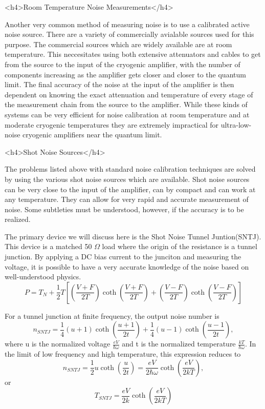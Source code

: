 \documentclass[11pt]{article}
\begin{document}
<h4>Room Temperature Noise Measurements</h4>


	
	Another very common method of measuring noise is to use a calibrated active noise source.  There are a variety of commercially avialable sources used for this purpose.  The commercial sources which are widely available are at room temperature.  This neccesitates using both extensive attenuators and cables to get from the source to the input of the cryogenic amplifier, with the number of components increasing as the amplifier gets closer and closer to the quantum limit.  The final accuracy of the noise at the input of the amplifier is then dependent on knowing the exact attenuation and temperature of every stage of the measurement chain from the source to the amplifier.  While these kinds of systems can be very efficient for noise calibration at room temperature and at moderate cryogenic temperatures they are extremely impractical for ultra-low-noise cryogenic amplifiers near the quantum limit.  

	<h4>Shot Noise Sources</h4>
	



	The problems listed above with standard noise calibration techniques are solved by using the various shot noise sources which are available.  Shot noise sources can be very close to the input of the amplifier, can by compact and can work at any temperature.  They can allow for very rapid and accurate measurement of noise.  Some subtleties must be understood, however, if the accuracy is to be realized.  




	The primary device we will discuss here is the Shot Noise Tunnel Juntion(SNTJ).  This device is a matched 50 $\Omega$ load where the origin of the resistance is a tunnel junction.  By applying a DC bias current to the junciton and measuring the voltage, it is possible to have a very accurate knowledge of the noise based on well-understood physics.  
$$P = T_N + \frac{1}{2}T\left[   \left(\frac{V+F}{2T}\right) \coth{\left(\frac{V+F}{2T}\right)} + \left(\frac{V-F}{2T}\right) \coth{\left(\frac{V-F}{2T}\right)}    \right]$$





     	For a tunnel junction at finite frequency, the output noise number is 
$$n_{SNTJ} = \frac{1}{4}\left( u + 1\right)\coth{\left(\frac{u+1}{2t}\right)} + \frac{1}{4}\left( u - 1 \right)\coth{\left(\frac{u-1}{2t}\right)} ,
$$where u is the normalized voltage $\frac{eV}{\hbar\omega}$ and t is the normalized temperature $\frac{kT}{\hbar\omega}$. In the limit of low frequency and high temperature, this expression reduces to 
$$n_{SNTJ} = \frac{1}{2}u\coth{\left(\frac{u}{2t}\right)} = \frac{eV}{2\hbar\omega}\coth{\left(\frac{eV}{2kT}\right)}, 
$$
or
$$
T_{SNTJ} = \frac{eV}{2k}\coth{\left(\frac{eV}{2kT}\right)}
$$
\end{document}
